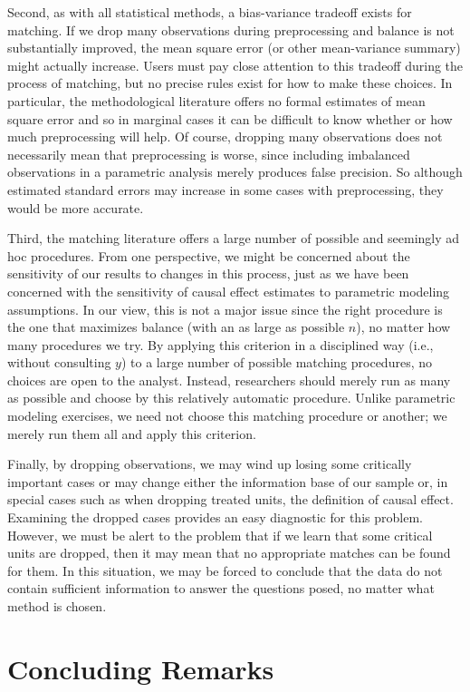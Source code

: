 \documentclass[11pt,titlepage]{article}
\begin{document}
Second, as with all statistical methods, a bias-variance tradeoff
exists for matching.  If we drop many observations during
preprocessing and balance is not substantially improved, the mean
square error (or other mean-variance summary) might actually increase.
Users must pay close attention to this tradeoff during the process of
matching, but no precise rules exist for how to make these choices.
In particular, the methodological literature offers no formal
estimates of mean square error and so in marginal cases it can be
difficult to know whether or how much preprocessing will help.  Of
course, dropping many observations does not necessarily mean that
preprocessing is worse, since including imbalanced observations in a
parametric analysis merely produces false precision.  So although
estimated standard errors may increase in some cases with
preprocessing, they would be more accurate.

Third, the matching literature offers a large number of possible and
seemingly ad hoc procedures.  From one perspective, we might be
concerned about the sensitivity of our results to changes in this
process, just as we have been concerned with the sensitivity of causal
effect estimates to parametric modeling assumptions.  In our view,
this is not a major issue since the right procedure is the one that
maximizes balance (with an as large as possible $n$), no matter how many
procedures we try.  By applying this criterion in a disciplined way
(i.e., without consulting $y$) to a large number of possible matching
procedures, no choices are open to the analyst.  Instead, researchers
should merely run as many as possible and choose by this relatively
automatic procedure.  Unlike parametric modeling exercises, we need
not choose this matching procedure or another; we merely run them all
and apply this criterion.

Finally, by dropping observations, we may wind up losing some
critically important cases or may change either the information base
of our sample or, in special cases such as when dropping treated
units, the definition of causal effect.  Examining the dropped cases
provides an easy diagnostic for this problem.  However, we must be
alert to the problem that if we learn that some critical units are
dropped, then it may mean that no appropriate matches can be found for
them.  In this situation, we may be forced to conclude that the data
do not contain sufficient information to answer the questions posed,
no matter what method is chosen.

\section{Concluding Remarks}
\end{document}

